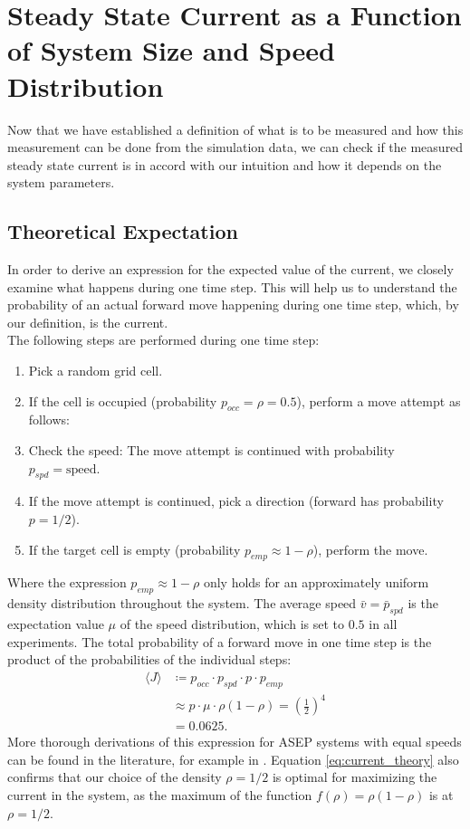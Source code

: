 \section{Steady State Current as a Function of System Size and Speed Distribution}
\label{sec:steady_state_current}
Now that we have established a definition of what is to be measured and how this measurement can be done from the simulation data, we can check if the measured steady state current is in accord with our intuition and how it depends on the system parameters. 

\subsection{Theoretical Expectation}
\label{sec:theoretical_expectations}
In order to derive an expression for the expected value of the current, we closely examine what happens during one time step. This will help us to understand the probability of an actual forward move happening during one time step, which, by our definition, is the current.
\\
The following steps are performed during one time step:
\begin{enumerate}
    \item Pick a random grid cell.
    \item If the cell is occupied (probability $p_{occ}=\rho=0.5$), perform a move attempt as follows:
    \item Check the speed: The move attempt is continued with probability $p_{spd}=\text{speed}$.
    \item If the move attempt is continued, pick a direction (forward has probability $p=1/2$).
    \item If the target cell is empty (probability $p_{emp}\approx 1-\rho$), perform the move.
\end{enumerate}
Where the expression $p_{emp}\approx 1-\rho$ only holds for an approximately uniform density distribution throughout the system. The average speed $\bar{v} = \bar{p}_{spd}$ is the expectation value $\mu$ of the speed distribution, which is set to $0.5$ in all experiments. The total probability of a forward move in one time step is the product of the probabilities of the individual steps:
\begin{align}
    \langle J\rangle &\coloneqq p_{occ} \cdot p_{spd} \cdot p \cdot p_{emp} \label{eq:current_theory} \\
                     &\approx p \cdot \mu \cdot \rho (1-\rho) = \left(\frac{1}{2}\right)^4 \nonumber \\
                     &= 0.0625 \text{.}\nonumber
\end{align}
More thorough derivations of this expression for ASEP systems with equal speeds can be found in the literature, for example in \cite[section 2.3.2]{daquila_monte_nodate}. Equation \ref{eq:current_theory} also confirms that our choice of the density $\rho=1/2$ is optimal for maximizing the current in the system, as the maximum of the function $f(\rho) = \rho(1-\rho)$ is at $\rho=1/2$.


